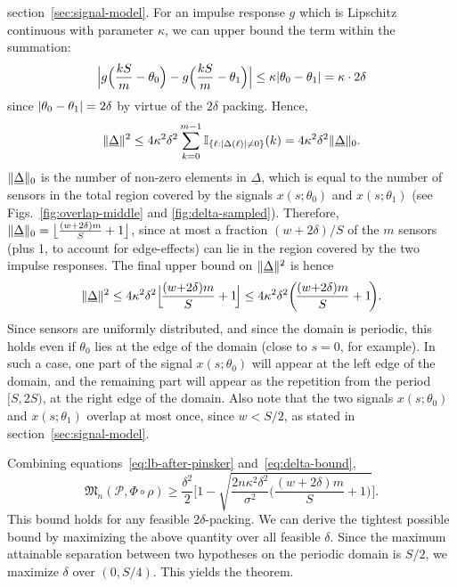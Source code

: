 \documentclass[conference,letterpaper]{IEEEtran}
\providecommand{\v}{}
\renewcommand{\v}[1]{\underline{#1}}
\DeclarePairedDelimiter\abs{\lvert}{\rvert}
\DeclarePairedDelimiter\norm{\lVert}{\rVert}
\DeclarePairedDelimiter\floor{\lfloor}{\rfloor}
\newcommand{\Phiorho}{\Phi\!\circ\!\rho}
\begin{document}
\begin{IEEEproof}
section~\ref{sec:signal-model}. For an impulse response $g$ which is Lipschitz
continuous with parameter $\kappa$, we can upper bound the term within the
summation:
\begin{equation}
	\abs[\Big]{g\Big(\frac{kS}{m} - \theta_0\Big) - g\Big(\frac{kS}{m} - \theta_1\Big)} \leq \kappa \abs{\theta_0 - \theta_1} = \kappa \cdot 2\delta
\end{equation}
since $\abs{\theta_0 - \theta_1} = 2\delta$ by virtue of the $2\delta$ packing.
Hence,
\begin{equation}
	\norm{\v\Delta}^2 \leq 4 \kappa^2 \delta^2 \sum_{k=0}^{m-1} \mathbb I_{\{\ell: \abs{\Delta(\ell)} \neq 0\}}(k) = 4 \kappa^2 \delta^2 \norm{\v\Delta}_0.
\end{equation}
$\norm{\v\Delta}_0$ is the number of non-zero elements in $\v\Delta$, which is
equal to the number of sensors in the total region covered by the signals
$x(s;\theta_0)$ and $x(s;\theta_1)$ (see Figs.~\ref{fig:overlap-middle} and
\ref{fig:delta-sampled}). Therefore, $\norm{\v\Delta}_0 = \floor[\big]{\frac{(w
+ 2\delta)m}{S} + 1}$, since at most a fraction $(w + 2\delta) / S$ of the $m$
sensors (plus 1, to account for edge-effects) can lie in the region covered by
the two impulse responses. The final upper bound on $\norm{\v\Delta}^2$ is
hence
\begin{equation} \label{eq:delta-bound}
	\norm{\v\Delta}^2 \leq 4 \kappa^2 \delta^2 \floor[\Big]{\!\frac{(w{+}2\delta)m}{S} + 1\!} \leq 4 \kappa^2 \delta^2 \bigg(\!\frac{(w{+}2\delta) m}{S} + 1\!\bigg).
\end{equation}
Since sensors are uniformly distributed, and since the domain is periodic, this
holds even if $\theta_0$ lies at the edge of the domain (close to $s=0$, for
example). In such a case, one part of the signal $x(s;\theta_0)$ will appear at
the left edge of the domain, and the remaining part will appear as the
repetition from the period $[S, 2S)$, at the right edge of the domain. Also
note that the two signals $x(s;\theta_0)$ and $x(s;\theta_1)$ overlap at most
once, since $w < S/2$, as stated in section~\ref{sec:signal-model}.

Combining equations~\eqref{eq:lb-after-pinsker} and~\eqref{eq:delta-bound},
\begin{equation} \label{eq:lb-after-delta-bound}
	\mathfrak{M}_n(\mathcal{P}, \Phiorho) \geq \frac{\delta^2}{2} \Bigg[1 - \sqrt{\frac{2n \kappa^2 \delta^2}{\sigma^2}\bigg(\!\frac{(w{+}2\delta) m}{S} + 1\!\bigg)} \Bigg].
\end{equation}
This bound holds for any feasible $2\delta$-packing. We can derive the tightest
possible bound by maximizing the above quantity over all feasible $\delta$.
Since the maximum attainable separation between two hypotheses on the periodic
domain is $S/2$, we maximize $\delta$ over $(0, S/4)$. This yields the theorem.


\end{IEEEproof}
\end{document}

